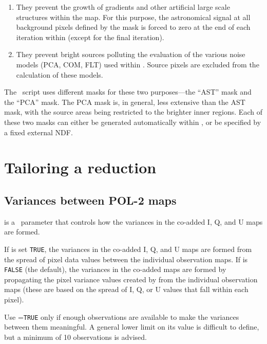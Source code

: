 \begin{enumerate}
\item They prevent the growth of gradients and other artificial large
  scale structures within the map.  For this purpose, the astronomical
  signal at all background pixels defined by the mask is forced to
  zero at the end of each iteration within  (except for the
  final iteration).
\item They prevent bright sources polluting the evaluation of the
  various noise models (PCA, COM, FLT) used within . Source
  pixels are excluded from the calculation of these models.
\end{enumerate}


The \poltwomap\ script uses different masks for these two purposes---the
``AST'' mask and the ``PCA'' mask.  The PCA mask is, in general, less
extensive than the AST mask, with the source areas being restricted to
the brighter inner regions.  Each of these two masks can either be
generated automatically within \poltwomap, or be specified by a fixed
external NDF.



\section{Tailoring a reduction}
\label{sec:tailoredDR}

\subsection*{Variances between POL-2 maps}

 is a \poltwomap\ parameter that controls how the variances in the
co-added I, Q, and U maps are formed.

If  is set \texttt{TRUE}, the variances in the co-added I, Q, and U maps
are formed from the spread of pixel data values between the individual
observation maps. If  is \texttt{FALSE} (the default), the variances in
the co-added maps are formed by propagating the pixel variance values
created by  from the individual observation maps (these are
based on the spread of I, Q, or U values that fall within each pixel).

Use =\texttt{TRUE} only if enough observations are available to make the
variances between them meaningful. A general lower limit on its value
is difficult to define, but a minimum of 10 observations is advised.


